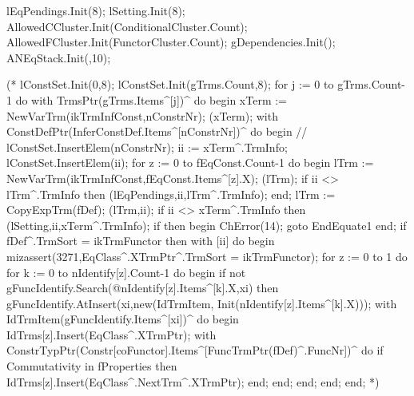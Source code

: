    lEqPendings.Init(8);
   lSetting.Init(8);
   AllowedCCluster.Init(ConditionalCluster.Count);
   AllowedFCluster.Init(FunctorCluster.Count);
   gDependencies.Init();
   ANEqStack.Init(,10);

(*   lConstSet.Init(0,8);
   lConstSet.Init(gTrms.Count,8);
   for j := 0 to gTrms.Count-1 do
    with TrmsPtr(gTrms.Items^[j])^ do
    begin
     xTerm := NewVarTrm(ikTrmInfConst,nConstrNr);
     (xTerm);
     with ConstDefPtr(InferConstDef.Items^[nConstrNr])^ do
     begin
//      lConstSet.InsertElem(nConstrNr);
      ii := xTerm^.TrmInfo;
      lConstSet.InsertElem(ii);
      for z := 0 to fEqConst.Count-1 do
       begin
        lTrm := NewVarTrm(ikTrmInfConst,fEqConst.Items^[z].X);
        (lTrm);
        if ii <> lTrm^.TrmInfo then
         (lEqPendings,ii,lTrm^.TrmInfo);
       end;
      lTrm := CopyExpTrm(fDef);
      (lTrm,ii);
      if ii <> xTerm^.TrmInfo then
        (lSetting,ii,xTerm^.TrmInfo);
      if  then begin ChError(14); goto EndEquate1 end;
      if fDef^.TrmSort = ikTrmFunctor then
       with [ii] do
        begin
         mizassert(3271,EqClass^.XTrmPtr^.TrmSort = ikTrmFunctor);
         for z := 0 to 1 do
          for k := 0 to nIdentify[z].Count-1 do
           begin
            if not gFuncIdentify.Search(@nIdentify[z].Items^[k].X,xi) then
             gFuncIdentify.AtInsert(xi,new(IdTrmItem, Init(nIdentify[z].Items^[k].X)));
            with IdTrmItem(gFuncIdentify.Items^[xi])^ do
             begin
              IdTrms[z].Insert(EqClass^.XTrmPtr);
              with ConstrTypPtr(Constr[coFunctor].Items^[FuncTrmPtr(fDef)^.FuncNr])^ do
               if Commutativity in fProperties then
                IdTrms[z].Insert(EqClass^.NextTrm^.XTrmPtr);
             end;
           end;
        end;
     end;
    end;
*)

